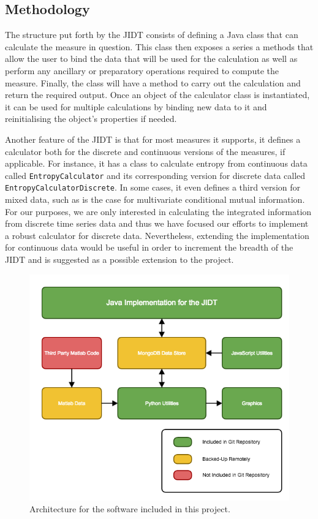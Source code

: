 \documentclass[a4paper,11pt]{article}
\begin{document}
\subsection{Methodology}

The structure put forth by the JIDT consists of defining a Java class that can calculate the measure in question. This class then exposes a series a methods that allow the user to bind the data that will be used for the calculation as well as perform any ancillary or preparatory operations required to compute the measure. Finally, the class will have a method to carry out the calculation and return the required output. Once an object of the calculator class is instantiated, it can be used for multiple calculations by binding new data to it and reinitialising the object's properties if needed. 

Another feature of the JIDT is that for most measures it supports, it defines a calculator both for the discrete and continuous versions of the measures, if applicable. For instance, it has a class to calculate entropy from continuous data called \texttt{EntropyCalculator} and its corresponding version for discrete data called \texttt{EntropyCalculatorDiscrete}. In some cases, it even defines a third version for mixed data, such as is the case for multivariate conditional mutual information. For our purposes, we are only interested in calculating the integrated information from discrete time series data and thus we have focused our efforts to implement a robust calculator for discrete data. Nevertheless, extending the implementation for continuous data would be useful in order to increment the breadth of the JIDT and is suggested as a possible extension to the project.

\begin{figure}[H]
\begin{center}
\includegraphics[scale = 0.5]{figures/architecture}
\caption{
	Architecture for the software included in this project.
	\label{fig:architecture}
}
\end{center}
\end{figure}
\end{document}
